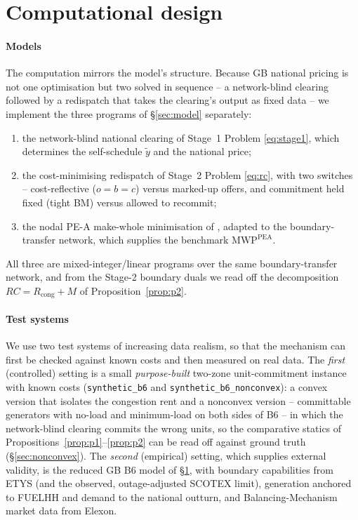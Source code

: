 \documentclass[review,3p,times]{elsarticle}
\theoremstyle{plain}
\theoremstyle{definition}
\begin{document}
\section{Computational design}
\label{sec:comp}

\paragraph{Models} The computation mirrors the model's structure. Because GB
national pricing is not one optimisation but two solved in sequence -- a
network-blind clearing followed by a redispatch that takes the clearing's output
as fixed data -- we implement the three programs of \S\ref{sec:model} separately:
\begin{enumerate}
\item the network-blind national clearing of Stage~1 Problem \eqref{eq:stage1}, which
determines the self-schedule $\tilde y$ and the national price;
\item the cost-minimising redispatch of Stage~2 Problem \eqref{eq:rc}, with two switches -- %
cost-reflective ($o=b=c$) versus marked-up offers, and commitment held fixed
(tight BM) versus allowed to recommit;
\item the nodal PE-A make-whole minimisation of \citet{bichler2022}, adapted to
the boundary-transfer network, which supplies the benchmark
$\mathrm{MWP}^{\mathrm{PEA}}$.
\end{enumerate}
All three are mixed-integer/linear programs over the same boundary-transfer
network, and from the Stage-2 boundary duals we read off the decomposition
$RC=R_{\mathrm{cong}}+M$ of Proposition~\ref{prop:p2}.

\paragraph{Test systems} We use two test systems of increasing data realism, so
that the mechanism can first be checked against known costs and then measured on
real data. The \emph{first} (controlled) setting is a small \emph{purpose-built}
two-zone unit-commitment instance with known costs
(\texttt{synthetic\_b6} and \texttt{synthetic\_b6\_nonconvex}): a convex
version that isolates the congestion rent and a nonconvex version -- committable
generators with no-load and minimum-load on both sides of B6 -- in which the
network-blind clearing commits the wrong units, so the comparative statics of
Propositions~\ref{prop:p1}--\ref{prop:p2} can be read off against ground truth
(\S\ref{sec:nonconvex}).  The \emph{second} (empirical) setting, which supplies external
validity, is the reduced GB B6 model of
\S\ref{sec:comp}, with boundary capabilities from ETYS (and the observed,
outage-adjusted SCOTEX limit), generation anchored to FUELHH and demand to the
national outturn, and Balancing-Mechanism market data from Elexon.
\end{document}
